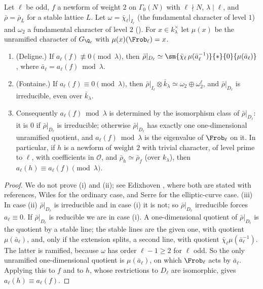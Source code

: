 \begin{theorem}\label{thm:modgalrep:deligne-fontaine}
Let $\ell$ be odd, $f$ a newform of weight $2$ on $\Gamma_0(N)$ with $\ell\nmid N$, $\lambda\mid\ell$, and $\bar\rho=\bar\rho_L$ for a stable lattice $L$. Let $\omega=\bar\chi_\ell|_{I_\ell}$ (the
fundamental character of level $1$) and $\omega_2$ a fundamental character of level $2$ (). For $x\in k_\lambda^\times$ let $\mu(x)$ be the unramified
character of $G_{\Q_\ell}$ with $\mu(x)(\Frob_\ell)=x$.
\begin{enumerate}[label=(\roman*)]
\item (Deligne.) If $a_\ell(f)\not\equiv0\pmod\lambda$, then $\bar\rho|_{D_\ell}\simeq\sm{\bar\chi_\ell\,\mu(\bar a_\ell^{-1})}{*}{0}{\mu(\bar a_\ell)}$, where $\bar a_\ell=a_\ell(f)\bmod\lambda$.
\item (Fontaine.) If $a_\ell(f)\equiv0\pmod\lambda$, then $\bar\rho|_{I_\ell}\otimes\bar k_\lambda\simeq\omega_2\oplus\omega_2^\ell$, and $\bar\rho|_{D_\ell}$ is irreducible, even over $\bar k_\lambda$.
\item Consequently $a_\ell(f)\bmod\lambda$ is determined by the isomorphism class of $\bar\rho|_{D_\ell}$: it is $0$ if $\bar\rho|_{D_\ell}$ is irreducible; otherwise
$\bar\rho|_{D_\ell}$ has exactly one one-dimensional unramified quotient, and $a_\ell(f)\bmod\lambda$ is the eigenvalue of $\Frob_\ell$ on it. In particular, if $h$ is a
newform of weight $2$ with trivial character, of level prime to $\ell$, with coefficients in $\mathcal{O}$, and $\bar\rho_h\simeq\bar\rho_f$ (over $k_\lambda$), then
$a_\ell(h)\equiv a_\ell(f)\pmod\lambda$.
\end{enumerate}
\end{theorem}

\begin{proof}
We do not prove (i) and (ii); see Edixhoven \cite[Section 2]{Edixhoven92}, where both are stated with references, Wiles \cite{Wiles88} for the
ordinary case, and Serre \cite[Section 1]{Serre72} for the elliptic-curve case. (iii) In case (ii) $\bar\rho|_{D_\ell}$ is irreducible and in case (i) it is not;
so $\bar\rho|_{D_\ell}$ irreducible forces $a_\ell\equiv0$. If $\bar\rho|_{D_\ell}$ is reducible we are in case (i). A one-dimensional quotient of $\bar\rho|_{D_\ell}$ is the quotient by a
stable line; the stable lines are the given one, with quotient $\mu(\bar a_\ell)$, and, only if the extension splits, a second line, with quotient
$\bar\chi_\ell\mu(\bar a_\ell^{-1})$. The latter is ramified, because $\omega$ has order $\ell-1\ge2$ for $\ell$ odd. So the only unramified one-dimensional quotient is
$\mu(\bar a_\ell)$, on which $\Frob_\ell$ acts by $\bar a_\ell$. Applying this to $f$ and to $h$, whose restrictions to $D_\ell$ are isomorphic, gives $a_\ell(h)\equiv a_\ell(f)$.
\end{proof}

